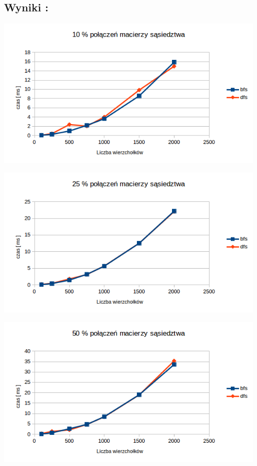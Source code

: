 \documentclass[10 pt]{article}
\begin{document}
\subsection{Wyniki : }
\begin{center}
\includegraphics[scale=0.7]{10.png}
\end{center}
\begin{center}
\includegraphics[scale=0.7]{20.png}
\end{center}
\begin{center}
\includegraphics[scale=0.7]{50.png}
\end{center}
\end{document}

